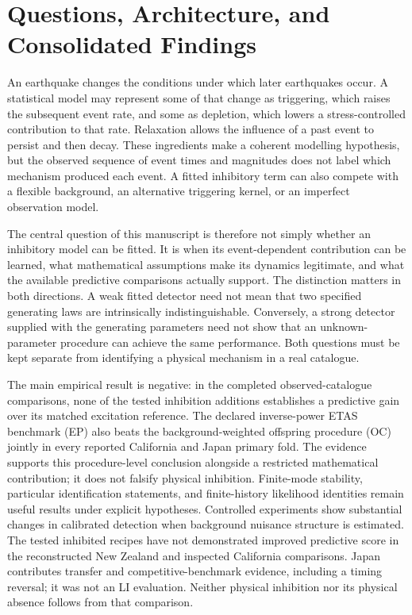 \chapter{Questions, Architecture, and Consolidated Findings}\label{chap:introduction}
\label{ch:introduction}

An earthquake changes the conditions under which later earthquakes occur. A statistical model may represent some of that change as triggering, which raises the subsequent event rate, and some as depletion, which lowers a stress-controlled contribution to that rate. Relaxation allows the influence of a past event to persist and then decay. These ingredients make a coherent modelling hypothesis, but the observed sequence of event times and magnitudes does not label which mechanism produced each event. A fitted inhibitory term can also compete with a flexible background, an alternative triggering kernel, or an imperfect observation model.

The central question of this manuscript is therefore not simply whether an inhibitory model can be fitted. It is when its event-dependent contribution can be learned, what mathematical assumptions make its dynamics legitimate, and what the available predictive comparisons actually support. The distinction matters in both directions. A weak fitted detector need not mean that two specified generating laws are intrinsically indistinguishable. Conversely, a strong detector supplied with the generating parameters need not show that an unknown-parameter procedure can achieve the same performance. Both questions must be kept separate from identifying a physical mechanism in a real catalogue.

The main empirical result is negative: in the completed observed-catalogue comparisons, none of the tested inhibition additions establishes a predictive gain over its matched excitation reference. The declared inverse-power ETAS benchmark (EP) also beats the background-weighted offspring procedure (OC) jointly in every reported California and Japan primary fold. The evidence supports this procedure-level conclusion alongside a restricted mathematical contribution; it does not falsify physical inhibition. Finite-mode stability, particular identification statements, and finite-history likelihood identities remain useful results under explicit hypotheses. Controlled experiments show substantial changes in calibrated detection when background nuisance structure is estimated. The tested inhibited recipes have not demonstrated improved predictive score in the reconstructed New Zealand and inspected California comparisons. Japan contributes transfer and competitive-benchmark evidence, including a timing reversal; it was not an LI evaluation. Neither physical inhibition nor its physical absence follows from that comparison.

